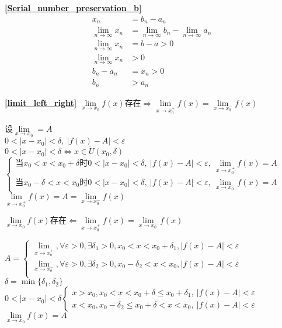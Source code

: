 \textbf{\large \ref{Serial_number_preservation_b}}
\begin{displaymath}
    \begin{split}
        x_n&=b_n-a_n\\
        \lim\limits_{n\to\infty} x_n &= \lim\limits_{n\to\infty} b_n-\lim\limits_{n\to\infty}a_n\\
        \lim\limits_{n\to\infty} x_n &=b-a>0\\
        \lim\limits_{n\to\infty} x_n &>0 \\
        b_n-a_n&=x_n > 0\\
        b_n&>a_n
    \end{split}
\end{displaymath}

\textbf{\large \ref{limit_left_right}}
$\lim\limits_{x\to x_0}f(x)\mbox{存在}\Rightarrow \lim\limits_{x\to x_0^+}f(x)=\lim\limits_{x\to x_0^-}f(x)$
\begin{center}
    设$\lim\limits_{x\to x_0}=A$\\
    $0<\left|x-x_0\right|<\delta,\ \left|f(x)-A\right|<\varepsilon$\\
    $0<\left|x-x_0\right|<\delta\Leftrightarrow x\in \mathring{U}(x_0,\delta)$
    $\begin{cases}
        \mbox{当}x_0<x<x_0+\delta\mbox{时}0<\left|x-x_0\right|<\delta,\ \left|f(x)-A\right|<\varepsilon,\ \lim\limits_{x\to x_0^+}f(x)=A\\
        \mbox{当}x_0-\delta<x<x_0\mbox{时}0<\left|x-x_0\right|<\delta,\ \left|f(x)-A\right|<\varepsilon,\ \lim\limits_{x\to x_0^-}f(x)=A
    \end{cases}$
    $\lim\limits_{x\to x_0^+}f(x)=A =\lim\limits_{x\to x_0^-}f(x)$
\end{center}
$\lim\limits_{x\to x_0}f(x)\mbox{存在}\Leftarrow\lim\limits_{x\to x_0^+}f(x)=\lim\limits_{x\to x_0^-}f(x)$
\begin{center}
    $A=\begin{cases}
    \lim\limits_{x\to x_o^+},\forall\varepsilon>0,\exists\delta_1>0,x_0<x<x_0+\delta_1,\left|f(x)-A\right|<\varepsilon\\
    \lim\limits_{x\to x_o^-},\forall\varepsilon>0,\exists\delta_2>0,x_0-\delta_2<x<x_0,\left|f(x)-A\right|<\varepsilon\\
    \end{cases}$\\
    $\delta = \min\{\delta_1,\delta_2\}$\\
    $0<\left|x-x_0\right|<\delta\begin{cases}
        x>x_0,x_0<x<x_0+\delta\leqslant x_0+\delta_1,\  \left|f(x)-A\right|<\varepsilon\\
        x<x_0,x_0-\delta_2\leqslant x_0+\delta<x<x_0,\ \left|f(x)-A\right|<\varepsilon
    \end{cases}$\\
    $\lim\limits_{x\to x_0}f(x)=A$
\end{center}

